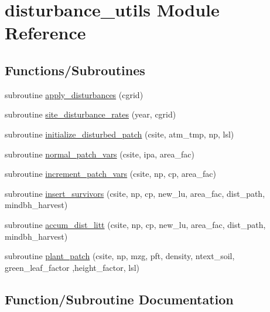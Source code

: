 \hypertarget{namespacedisturbance__utils}{}\section{disturbance\+\_\+utils Module Reference}
\label{namespacedisturbance__utils}
\subsection*{Functions/\+Subroutines}
\begin{DoxyCompactItemize}
\item 
subroutine \hyperlink{namespacedisturbance__utils_a29d6db4e94463404643e5c3666c67767}{apply\+\_\+disturbances} (cgrid)
\item 
subroutine \hyperlink{namespacedisturbance__utils_a9045765ed99ce8acf000838b2c532deb}{site\+\_\+disturbance\+\_\+rates} (year, cgrid)
\item 
subroutine \hyperlink{namespacedisturbance__utils_a31b6105dc67086438d6827bbffaf4bc4}{initialize\+\_\+disturbed\+\_\+patch} (csite, atm\+\_\+tmp, np, lsl)
\item 
subroutine \hyperlink{namespacedisturbance__utils_ae56e66a56b934ca784a19bd3c0bc2796}{normal\+\_\+patch\+\_\+vars} (csite, ipa, area\+\_\+fac)
\item 
subroutine \hyperlink{namespacedisturbance__utils_a60d031d31fcde31370f73cebaaaadb24}{increment\+\_\+patch\+\_\+vars} (csite, np, cp, area\+\_\+fac)
\item 
subroutine \hyperlink{namespacedisturbance__utils_ac25d6a408136dff3bccca56269ca858f}{insert\+\_\+survivors} (csite, np, cp, new\+\_\+lu, area\+\_\+fac, dist\+\_\+path, mindbh\+\_\+harvest)
\item 
subroutine \hyperlink{namespacedisturbance__utils_a5e78ef6d3bd2f31c0abfaf8e86045187}{accum\+\_\+dist\+\_\+litt} (csite, np, cp, new\+\_\+lu, area\+\_\+fac, dist\+\_\+path, mindbh\+\_\+harvest)
\item 
subroutine \hyperlink{namespacedisturbance__utils_a9fc5ab9ef8e1fa7eb1798412d868db50}{plant\+\_\+patch} (csite, np, mzg, pft, density, ntext\+\_\+soil, green\+\_\+leaf\+\_\+factor                                                                                                                                           ,height\+\_\+factor, lsl)
\end{DoxyCompactItemize}


\subsection{Function/\+Subroutine Documentation}
